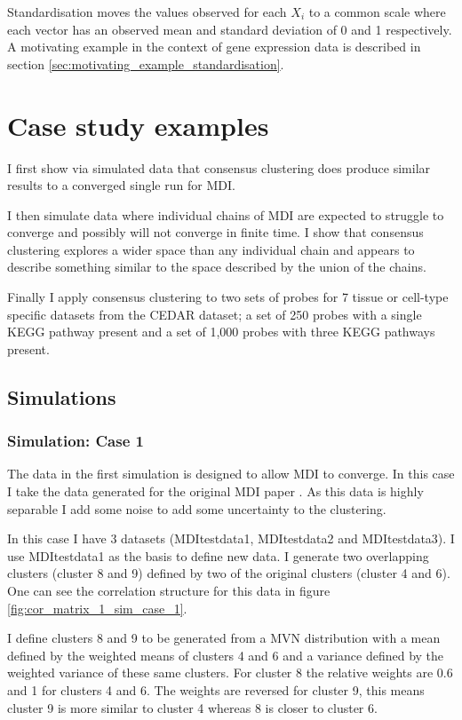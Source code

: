 \documentclass[14pt]{extarticle} %
\begin{document}
	Standardisation moves the values observed for each $X_i$ to a common scale where each vector has an observed mean and standard deviation of 0 and 1 respectively. A motivating example in the context of gene expression data is described in section \ref{sec:motivating_example_standardisation}.

	\section{Case study examples}
	I first show via simulated data that consensus clustering does produce similar results to a converged single run for MDI.
	
	I then simulate data where individual chains of MDI are expected to struggle to converge and possibly will not converge in finite time. I show that consensus clustering explores a wider space than any individual chain and appears to describe something similar to the space described by the union of the chains.
	
	Finally I apply consensus clustering to two sets of probes for 7 tissue or cell-type specific datasets from the CEDAR dataset; a set of 250 probes with a single KEGG pathway present and a set of 1,000 probes with three KEGG pathways present.
	
	\subsection{Simulations}
	\subsubsection{Simulation: Case 1} \label{sec:sim:data:case_1}
	The data in the first simulation is designed to allow MDI to converge. In this case I take the data generated for the original MDI paper \citep{KirkBayesiancorrelatedclustering2012}. As this data is highly separable I add some noise to add some uncertainty to the clustering. 
	
	In this case I have 3 datasets (MDItestdata1, MDItestdata2 and MDItestdata3). I use MDItestdata1 as the basis to define new data. I generate two overlapping clusters (cluster 8 and 9) defined by two of the original clusters (cluster 4 and 6). One can see the correlation structure for this data in figure \ref{fig:cor_matrix_1_sim_case_1}.
	
	I define clusters 8 and 9 to be generated from a MVN distribution with a mean defined by the weighted means of clusters 4 and 6 and a variance defined by the weighted variance of these same clusters. For cluster 8 the relative weights are 0.6 and 1 for clusters 4 and 6. The weights are reversed for cluster 9, this means cluster 9 is more similar to cluster 4 whereas 8 is closer to cluster 6. 
	
\end{document}
